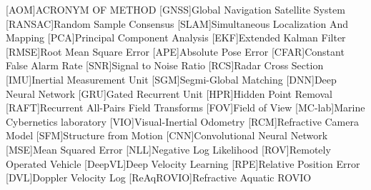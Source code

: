 [AOM]{ACRONYM OF METHOD}
[GNSS]{Global Navigation Satellite System}
[RANSAC]{Random Sample Consensus}
[SLAM]{Simultaneous Localization And Mapping}
[PCA]{Principal Component Analysis}
[EKF]{Extended Kalman Filter}
[RMSE]{Root Mean Square Error} 
[APE]{Absolute Pose Error}
[CFAR]{Constant False Alarm Rate}
[SNR]{Signal to Noise Ratio}
[RCS]{Radar Cross Section}
[IMU]{Inertial Measurement Unit}
[SGM]{Segmi-Global Matching}
[DNN]{Deep Neural Network}
[GRU]{Gated Recurrent Unit}
[HPR]{Hidden Point Removal}
[RAFT]{Recurrent All-Pairs Field Transforms}
[FOV]{Field of View}
[MC-lab]{Marine Cybernetics laboratory}
[VIO]{Visual-Inertial Odometry}
[RCM]{Refractive Camera Model}
[SFM]{Structure from Motion}
[CNN]{Convolutional Neural Network}
[MSE]{Mean Squared Error}
[NLL]{Negative Log Likelihood}
[ROV]{Remotely Operated Vehicle}
[DeepVL]{Deep Velocity Learning}
\newcommand{\Eq}{Eq.}
[RPE]{Relative Position Error}
[DVL]{Doppler Velocity Log}
[ReAqROVIO]{Refractive Aquatic ROVIO}


